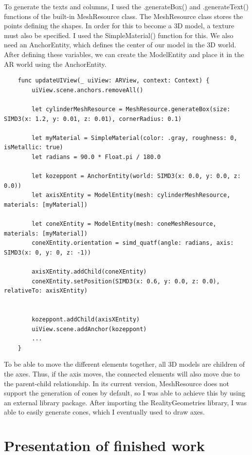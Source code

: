 \documentclass{report}
\begin{document}
To generate the texts and columns, I used the .generateBox() and .generateText() functions of the built-in MeshResource class.
The MeshResource class stores the points defining the shapes. In order for this to become a 3D model, a texture must also be specified. I used the SimpleMaterial() function for this.
We also need an AnchorEntity, which defines the center of our model in the 3D world.
After defining these variables, we can create the ModelEntity and place it in the AR world using the AnchorEntity.

\begin{lstlisting}
    func updateUIView(_ uiView: ARView, context: Context) {
        uiView.scene.anchors.removeAll()
        
        let cylinderMeshResource = MeshResource.generateBox(size: SIMD3(x: 1.2, y: 0.01, z: 0.01), cornerRadius: 0.1)
        
        let myMaterial = SimpleMaterial(color: .gray, roughness: 0, isMetallic: true)
        let radians = 90.0 * Float.pi / 180.0
            
        let kozeppont = AnchorEntity(world: SIMD3(x: 0.0, y: 0.0, z: 0.0))
        let axisXEntity = ModelEntity(mesh: cylinderMeshResource, materials: [myMaterial])
        
        let coneXEntity = ModelEntity(mesh: coneMeshResource, materials: [myMaterial])
        coneXEntity.orientation = simd_quatf(angle: radians, axis: SIMD3(x: 0, y: 0, z: -1))
        
        axisXEntity.addChild(coneXEntity)
        coneXEntity.setPosition(SIMD3(x: 0.6, y: 0.0, z: 0.0), relativeTo: axisXEntity)
        
        
        kozeppont.addChild(axisXEntity)
        uiView.scene.addAnchor(kozeppont)
        ...
    }
\end{lstlisting}

To be able to move the different elements together, all 3D models are children of the axes. Thus, if the axis moves, the connected elements will also move due to the parent-child relationship. In its current version, MeshResource does not support the generation of cones by default, so I was able to achieve this by using an external library package. After importing the RealityGeometries library, I was able to easily generate cones, which I eventually used to draw axes.

\chapter{Presentation of finished work}
\end{document}
